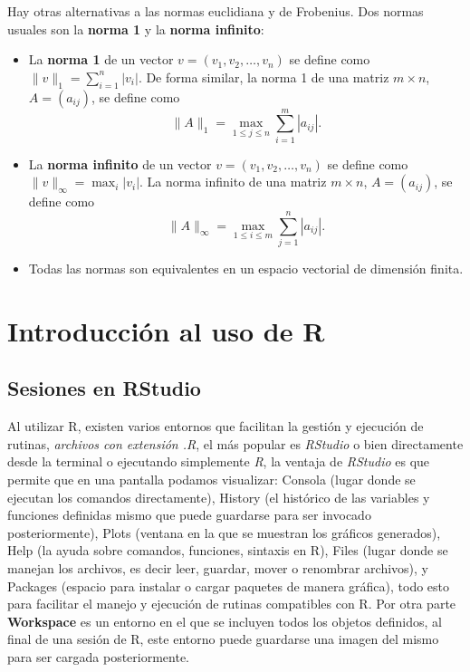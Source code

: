 \documentclass[12pt]{article}
\begin{document}
Hay otras alternativas a las normas euclidiana y de Frobenius. Dos normas usuales son la \textbf{norma 1} y la \textbf{norma infinito}:

\begin{itemize}
\item La \textbf{norma 1} de un vector $ v = (v_1, v_2, \ldots, v_n) $ se define como $ \|v\|_1 = \sum_{i=1}^n |v_i| $.  De forma similar, la norma 1 de una matriz $ m \times n $, $ A = (a_{ij}) $, se define como $$\|A\|_1 = \max_{1 \leq j \leq n} \sum_{i=1}^m |a_{ij}|.$$

\item La \textbf{norma infinito} de un vector $ v = (v_1, v_2, \ldots, v_n) $ se define como $ \|v\|_\infty = \max_i |v_i| $.   La norma infinito de una matriz $ m \times n $, $ A = (a_{ij}) $, se define como  $$\|A\|_\infty = \max_{1 \leq i \leq m} \sum_{j=1}^n |a_{ij}|.$$

\item Todas las normas son equivalentes en un espacio vectorial de dimensión finita. 
\end{itemize}

\section{Introducción al uso de R}

\subsection{Sesiones en RStudio}

Al utilizar R, existen varios entornos que facilitan la gestión y ejecución de rutinas,  \textit{archivos con extensión .R}, el más popular es \textit{RStudio} o bien directamente desde la terminal o ejecutando simplemente \textit{R}, la ventaja de \textit{RStudio} es que permite que en una pantalla podamos visualizar: Consola (lugar donde se ejecutan los comandos directamente), History (el histórico de las variables y funciones definidas mismo que puede guardarse para ser invocado posteriormente), Plots (ventana en la que se muestran los gráficos generados), Help (la ayuda sobre comandos, funciones, sintaxis en R), Files (lugar donde se manejan los archivos, es decir leer, guardar, mover o renombrar archivos), y Packages (espacio para instalar o cargar paquetes de manera gráfica), todo esto para facilitar el manejo y ejecución de rutinas compatibles con R. Por otra parte \textbf{Workspace} es un entorno en el que se incluyen todos los objetos definidos,  al final de una sesión de R,  este entorno puede guardarse una imagen del mismo para ser cargada posteriormente. \bigskip
\end{document}
